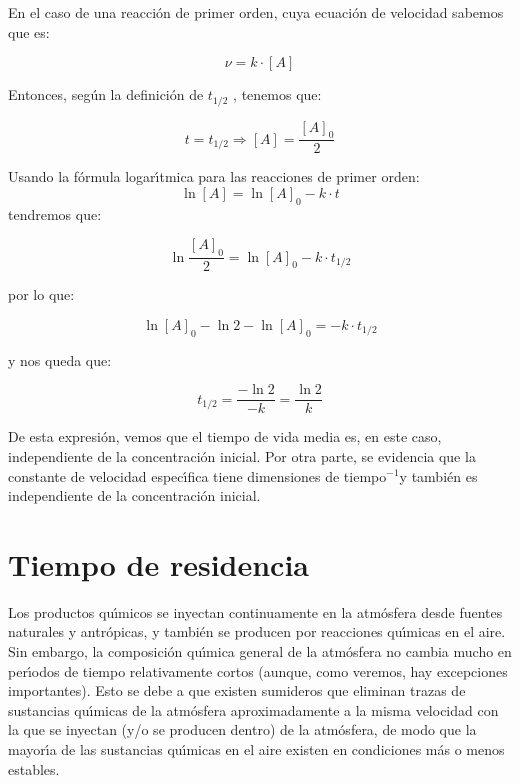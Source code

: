 En el caso de una reacci\'on de primer orden, cuya ecuaci\'on de velocidad sabemos que es: 

\begin{equation*}
\nu =k\cdot [A]
\end{equation*}

Entonces, seg\'un la definici\'on de  $t_{1/2}$ , tenemos que:

\begin{equation*}
t=t_{1/2} \Longrightarrow  [A]=\frac{[A]_0}{2}
\end{equation*}

Usando la f\'ormula logar\'{\i}tmica para las reacciones de primer orden:
\begin{equation*}
\ln[A]=\ln[A]_0-k\cdot t
\end{equation*}
tendremos que: 

$$\ln\frac{[A]_0}{2}=\ln[A]_0-k\cdot t_{1/2}$$

por lo que:

$$\ln[A]_0-\ln2-\ln[A]_0=-k\cdot t_{1/2}$$

y nos queda que:

$$t_{1/2}=\frac{-\ln2}{-k}=\frac{\ln2}{k}$$

De esta expresi\'on, vemos que el tiempo de vida media es, en este caso, independiente de la concentraci\'on inicial. Por otra parte, se evidencia que la constante de velocidad espec\'{\i}fica tiene dimensiones de tiempo$^{-1}$y tambi\'en es independiente de la concentraci\'on inicial.

\section{Tiempo de residencia}\label{tdres}
Los productos qu\'{\i}micos se inyectan continuamente en la atm\'osfera desde fuentes naturales y antr\'opicas, y tambi\'en se producen por reacciones qu\'{\i}micas en el aire. Sin embargo, la composici\'on qu\'{\i}mica general de la atm\'osfera no cambia mucho en per\'{\i}odos de tiempo relativamente cortos (aunque, como veremos, hay excepciones importantes). Esto se debe a que existen sumideros que eliminan trazas de sustancias qu\'{\i}micas de la atm\'osfera aproximadamente a la misma velocidad con la que se inyectan (y/o se producen dentro) de la atm\'osfera, de modo que la mayor\'{\i}a de las sustancias qu\'{\i}micas en el aire existen en condiciones m\'as o menos estables.

